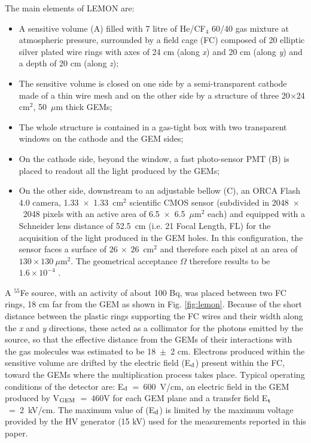 \documentclass[a4paper]{jpconf}
\begin{document}
The main elements of LEMON are:
\begin{itemize}
    \item A sensitive volume (A) filled with 7 litre of He/CF$_4$ 60/40 gas mixture at atmospheric pressure, surrounded by a field cage (FC) composed of 20 elliptic silver plated wire rings with axes of 24 cm (along {\it x}) and 20 cm (along {\it y}) and a depth of 20 cm (along {\it z});
    \item The sensitive volume is closed on one side by a semi-transparent cathode made of a thin wire mesh and on the other side by a structure of three 20$\times$24 cm$^2$, 50~$\mu$m thick GEMs;
    \item The whole structure is contained in a gas-tight box with two
      transparent windows on the cathode and the GEM sides;
    \item On the cathode side, beyond the window, a fast photo-sensor
      PMT
      (B) is placed to readout all the light produced by the GEMs;
    \item On the other side, downstream to an adjustable bellow (C),
      an ORCA Flash 4.0 camera,
      1.33~$\times$~1.33~cm$^2$ scientific CMOS sensor (subdivided in
      2048~$\times$~2048 pixels with an active area of
      6.5~$\times$~6.5~$\mu$m$^2$ each) and equipped with a Schneider
      lens
      distance of 52.5~cm (i.e. 21 Focal Length, FL) for the
      acquisition of the light produced in the GEM holes. In this
      configuration, the sensor faces a surface of
      $26~\times~26$~cm$^2$ and therefore each pixel at an area of
      $130 \times 130~\mu$m$^2$. The geometrical acceptance $\Omega$
      therefore results to be $1.6 \times 10^{-4}$
      \cite{bib:ieee_orange}.
\end{itemize}

A $^{55}$Fe source, with an activity of about 100 Bq, was placed
between two FC rings, 18 cm far from the GEM as shown in
Fig. \ref{fig:lemon}.  Because of the short distance between the
plastic rings supporting the FC wires and their width along the {\it
  x} and {\it y} directions, these acted as a collimator for the
photons emitted by the source, so that the effective distance from the
GEMs of their interactions with the gas molecules was estimated to be
18~$\pm$~2 cm. Electrons produced within the sensitive volume are
drifted by the electric field (E$_{\rm d}$) present within the FC,
toward the GEMs where the multiplication process takes place. Typical
operating conditions of the detector are: E$_{\rm d}$~=~600~V/cm, an
electric field in the GEM produced by V$_{\rm GEM}$~=~460V for each
GEM plane and a transfer field E$_{\rm t}$~=~2~kV/cm. The maximum
value of (E$_{\rm d}$) is limited by the maximum voltage provided by
the HV generator (15 kV) used for the measurements reported in this
paper.
\end{document}
